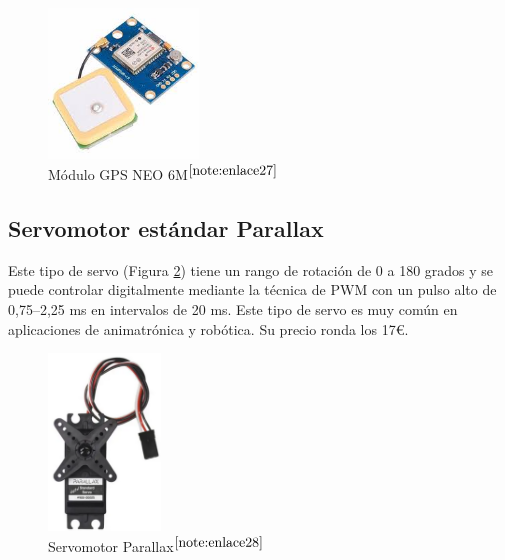 \begin{figure} [h!]
	\begin{center}
		\includegraphics[width=4cm]{figs/GPSNEO6MV2.jpeg}
	\end{center}
	\caption{Módulo GPS NEO 6M$^{\ref{note:enlace27}}$} 
\label{fig:gps}
\end{figure}

\setcounter{footnote}{27} %


\subsection{Servomotor estándar Parallax}
\label{subsec:motor}

Este tipo de servo (Figura \ref{fig:parallax}) tiene un rango de rotación de 0 a 180 grados y se puede controlar digitalmente mediante la técnica de \ac{PWM} con un pulso alto de 0,75–2,25 ms en intervalos de 20 ms. Este tipo de servo es muy común en aplicaciones de animatrónica y robótica. Su precio ronda los 17€.

\begin{figure} [h!]
	\begin{center}
		\includegraphics[width=3cm]{figs/parallax.png}
	\end{center}
	\caption{Servomotor Parallax$^{\ref{note:enlace28}}$} 
	\label{fig:parallax}
\end{figure}


\setcounter{footnote}{28} %

